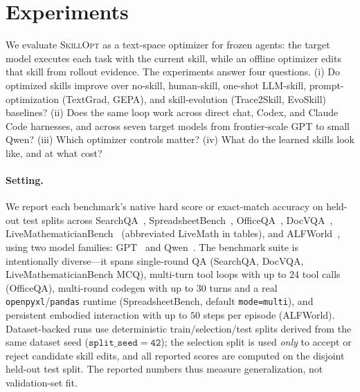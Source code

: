 \providecommand{\ourmethod}{\textsc{SkillOpt}}
\providecommand{\na}{--}
\providecommand{\harnessrow}[1]{\rowcolor{black!7}\multicolumn{8}{l}{\textbf{#1}}}
\providecommand{\methodcell}[1]{\cellcolor{blue!8}#1}
\providecommand{\ablationbenchmarkheader}{\textbf{Setting} & \textbf{SearchQA} & \textbf{Spreadsheet} & \textbf{LiveMath} \\}

\section{Experiments}
\label{sec:experiments}

We evaluate \ourmethod{} as a text-space optimizer for frozen agents: the target model executes each task with the current skill, while an offline optimizer edits that skill from rollout evidence. The experiments answer four questions. (i) Do optimized skills improve over no-skill, human-skill, one-shot LLM-skill, prompt-optimization (TextGrad, GEPA), and skill-evolution (Trace2Skill, EvoSkill) baselines? (ii) Does the same loop work across direct chat, Codex, and Claude Code harnesses, and across seven target models from frontier-scale GPT to small Qwen? (iii) Which optimizer controls matter? (iv) What do the learned skills look like, and at what cost?

\paragraph{Setting.}
We report each benchmark's native hard score or exact-match accuracy on held-out test splits across SearchQA~\citep{dunn2017searchqa}, SpreadsheetBench~\citep{spreadsheetbench}, OfficeQA~\citep{opsahl2026officeqa}, DocVQA~\citep{mathew2021docvqa}, LiveMathematicianBench~\citep{he2026livemathematicianbenchlivebenchmarkmathematicianlevel} (abbreviated LiveMath in tables), and ALFWorld~\citep{alfworld}, using two model families: GPT~\citep{openai2026gpt54} and Qwen~\citep{qwen3.5,qwen36_35b_a3b}. The benchmark suite is intentionally diverse---it spans single-round QA (SearchQA, DocVQA, LiveMathematicianBench MCQ), multi-turn tool loops with up to $24$ tool calls (OfficeQA), multi-round codegen with up to $30$ turns and a real \texttt{openpyxl}/\texttt{pandas} runtime (SpreadsheetBench, default \texttt{mode=multi}), and persistent embodied interaction with up to $50$ steps per episode (ALFWorld). Dataset-backed runs use deterministic train/selection/test splits derived from the same dataset seed ($\mathtt{split\_seed=42}$); the selection split is used \emph{only} to accept or reject candidate skill edits, and all reported scores are computed on the disjoint held-out test split. The reported numbers thus measure generalization, not validation-set fit.

